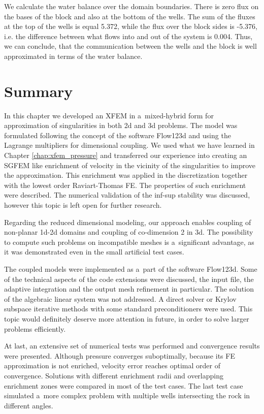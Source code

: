 We calculate the water balance over the domain boundaries.
There is zero flux on the bases of the block and also at the bottom of the wells.
The sum of the fluxes at the top of the wells is equal 5.372, while the flux over the 
block sides is -5.376, i.e. the difference between what flows into and out of the system is 0.004.
Thus, we can conclude, that the communication between the wells and the block 
is well approximated in terms of the water balance.

\section{Summary}
In this chapter we developed an XFEM in a~mixed-hybrid form for approximation of singularities in both 2d and 3d problems.
The model was formulated following the concept of the software Flow123d and using the Lagrange multipliers for dimensional coupling.
We used what we have learned in Chapter \ref{chap:xfem_pressure} and transferred our experience into creating
an SGFEM like enrichment of velocity in the vicinity of the singularities to improve the approximation.
This enrichment was applied in the discretization together with the lowest order Raviart-Thomas FE.
The properties of such enrichment were described.
The numerical validation of the inf-sup stability was discussed, however this topic is left open for further research.

Regarding the reduced dimensional modeling, our approach enables coupling of non-planar 1d-2d domains
and coupling of co-dimension 2 in 3d. The possibility to compute such problems on incompatible meshes is a~significant advantage,
as it was demonstrated even in the small artificial test cases.

The coupled models were implemented as a~part of the software Flow123d.
Some of the technical aspects of the code extensions were discussed,
the input file, the adaptive integration and the output mesh refinement in particular.
The solution of the algebraic linear system was not addressed.
A direct solver or Krylov subspace iterative methods with some standard preconditioners were used.
This topic would definitely deserve more attention in future, in order to solve larger problems efficiently.

At last, an extensive set of numerical tests was performed and convergence results were presented.
Although pressure converges suboptimally, because its FE approximation is not enriched, velocity error
reaches optimal order of convergence.
Solutions with different enrichment radii and overlapping enrichment zones were compared in most of the test cases.
The last test case simulated a~more complex problem with multiple wells intersecting the rock in different angles.




